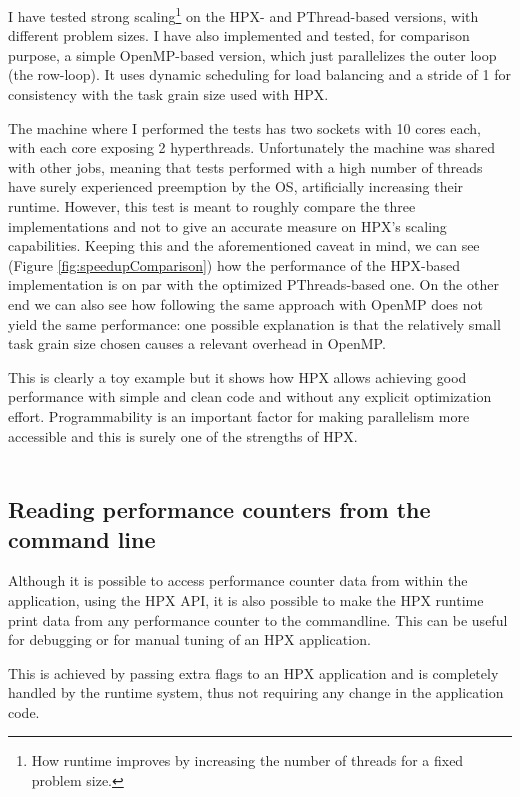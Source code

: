 I have tested strong scaling\footnote{How runtime improves by increasing the number of threads for a fixed problem size.} on the HPX- and PThread-based versions, with different problem sizes. I have also implemented and tested, for comparison purpose, a simple OpenMP-based version, which just parallelizes the outer loop (the row-loop). It uses dynamic scheduling for load balancing and a stride of 1 for consistency with the task grain size used with HPX.

The machine where I performed the tests has two sockets with 10 cores each, with each core exposing 2 hyperthreads. Unfortunately the machine was shared with other jobs, meaning that tests performed with a high number of threads have surely experienced preemption by the OS, artificially increasing their runtime.
However, this test is meant to roughly compare the three implementations and not to give an accurate measure on HPX's scaling capabilities. Keeping this and the aforementioned caveat in mind, we can see (Figure \ref{fig:speedupComparison}) how the performance of the HPX-based implementation is on par with the optimized PThreads-based one. On the other end we can also see how following the same approach with OpenMP does not yield the same performance: one possible explanation is that the relatively small task grain size chosen causes a relevant overhead in OpenMP.

This is clearly a toy example but it shows how HPX allows achieving good performance with simple and clean code and without any explicit optimization effort. Programmability is an important factor for making parallelism more accessible and this is surely one of the strengths of HPX.
~\\~

\subsection{Reading performance counters from the command line}
Although it is possible to access performance counter data from within the application, using the HPX API, it is also possible to make the HPX runtime print data from any performance counter to the commandline. This can be useful for debugging or for manual tuning of an HPX application.

This is achieved by passing extra flags to an HPX application and is completely handled by the runtime system, thus not requiring any change in the application code.

